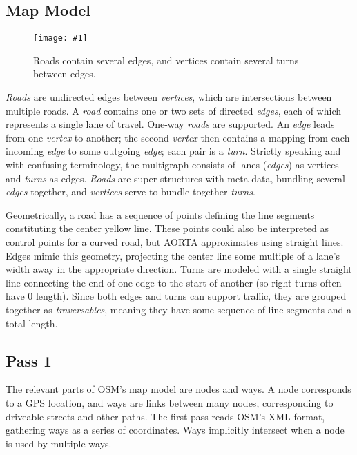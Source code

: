\documentclass[letterpaper, 10 pt, conference]{ieeeconf}  %
\newcommand{\pix}[3]{
  \begin{figure}[h]
    \centering \texttt{[image: \#1]}
    \caption{#2}
  \end{figure}
}
\begin{document}
\subsection{Map Model}

\pix{map_model.png}
    {Roads contain several edges, and vertices contain several turns between edges.}
    {scale=0.5}


\emph{Roads} are undirected edges between \emph{vertices}, which are
intersections between multiple roads. A \emph{road} contains one or two sets of
directed \emph{edges}, each of which represents a single lane of travel. One-way
\emph{roads} are supported. An \emph{edge} leads from one \emph{vertex} to
another; the second \emph{vertex} then contains a mapping from each incoming
\emph{edge} to some outgoing \emph{edge}; each pair is a \emph{turn}. Strictly
speaking and with confusing terminology, the multigraph consists of lanes
(\emph{edges}) as vertices and \emph{turns} as edges. \emph{Roads} are
super-structures with meta-data, bundling several \emph{edges} together, and
\emph{vertices} serve to bundle together \emph{turns}.

Geometrically, a road has a sequence of points defining the line segments
constituting the center yellow line. These points could also be interpreted as
control points for a curved road, but AORTA approximates using straight lines.
Edges mimic this geometry, projecting the center line some multiple of a lane's
width away in the appropriate direction. Turns are modeled with a single
straight line connecting the end of one edge to the start of another (so right
turns often have $0$ length). Since both edges and turns can support traffic,
they are grouped together as \emph{traversables}, meaning they have some
sequence of line segments and a total length.

\subsection{Pass 1}

The relevant parts of OSM's map model are nodes and ways. A node corresponds to
a GPS location, and ways are links between many nodes, corresponding to
driveable streets and other paths. The first pass reads OSM's XML format,
gathering ways as a series of coordinates. Ways implicitly intersect when a node
is used by multiple ways.
\end{document}
